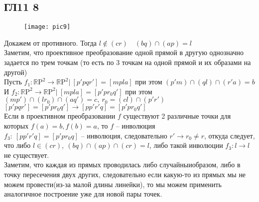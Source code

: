\subsection*{ГЛ11 8}
\begin{figure}[h]
	\texttt{[image: pic9]}
\end{figure}
Докажем от противного. Тогда $l \notin (cr)\quad (bq) \cap (ap) = l$\\
Заметим, что проективное преобразование одной прямой в другую однозначно задается по трем точкам (то есть по 3 точкам на одной прямой и их образами на другой)\\		
Пусть $f_1: \mathbb{R}\text{P}^2 \to \mathbb{R}\text{P}^2|\ [p'pqr'] = [mpla]$ при этом $(p'm) \cap (ql) \cap (r'a) = b$\\
И $f_2: \mathbb{R}\text{P}^2 \to \mathbb{R}\text{P}^2|\ [mpla]= [p'pr_0q']$ при этом $(mp') \cap (lr_0) \cap (aq') = c,\ r_0 = (cl) \cap (p'r')$\\
$[p'pqr'] = [p'pr_0q'] \rightarrow [pp'r'q] = [p'pr_0q']$\\
Если в проективном преобразовании $f$ существуют 2 различные точки для которых $f(a) = b, f(b) = a$, то $f$ -- инволюция\\
$f_3:\ [pp'r'q] = [p'pr_0q]$ -- инволюция, следовательно $r'\to r_0 \ne r$, откуда следует, что либо $l \in (cr),\ (bq) \cap (ap) \cap (cr) = l$, либо такой инволюции $f_3: l \to l$ не существует.\\
Заметим, что каждая из прямых проводилась либо случайныиобразом, либо в точку пересечения двух других, следовательно если какую-то из прямых мы не можем провести(из-за малой длины линейки), то мы можем применить аналогичное построение уже для новой пары точек.
